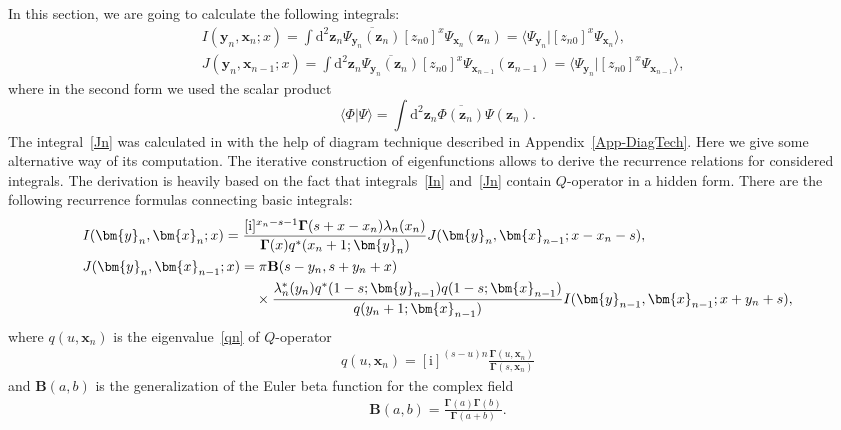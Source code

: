 \documentclass[10pt,a4paper]{amsart}
\renewcommand{\imath}{\mathrm{i}}
\numberwithin{equation}{section}
\begin{document}
In this section, we are going to calculate the following integrals:
\begin{align}
& \label{In}
I(\bm{y}_n,\bm{x}_{n};x) =
\int \mathrm{d}^{2}\bm{z}_n
\overline{\Psi_{\bm{y}_n}(\bm{z}_n)}
[z_{n0}]^{x}
\Psi_{\bm{x}_{n}}(\bm{z}_n) =
\langle\Psi_{\bm{y}_n}|[z_{n0}]^{x} \Psi_{\bm{x}_{n}}\rangle ,\\
& \label{Jn}
J(\bm{y}_n,\bm{x}_{n-1};x) =
\int \mathrm{d}^{2}\bm{z}_n
\overline{\Psi_{\bm{y}_n}(\bm{z}_n)}
[z_{n0}]^{x}
\Psi_{\bm{x}_{n-1}}(\bm{z}_{n-1}) =
\langle\Psi_{\bm{y}_n}|[z_{n0}]^{x} \Psi_{\bm{x}_{n-1}}\rangle ,
\end{align}
where in the second form we used the scalar product
\begin{equation*}
	\langle\Phi|\Psi\rangle =
	\int \mathrm{d}^{2}\bm{z}_n \overline{\Phi(\bm{z}_n)} \Psi(\bm{z}_n) .
\end{equation*}
The integral~\eqref{Jn} was calculated in \cite{Val20} with the help of diagram technique described in Appendix~\ref{App-DiagTech}.
Here we give some alternative way of its computation.
The iterative construction of eigenfunctions allows to derive the recurrence
relations for considered integrals. The derivation is heavily based on the fact that integrals~\eqref{In} and~\eqref{Jn} contain $Q$-operator in a hidden form. There are the following recurrence formulas connecting basic integrals:
\begin{align}
\label{In1}
&I(\bm{y}_n,\bm{x}_{n};x) = \frac{[\imath]^{x_n-s-1} \mathbf{\Gamma}(s+x-x_n) \lambda_n(x_n)}
{\mathbf{\Gamma}(x) q^*(x_n+1;\bm{y}_n)}
J(\bm{y}_n,\bm{x}_{n-1};x-x_n-s) ,\\
& \nonumber
J(\bm{y}_n,\bm{x}_{n-1};x) = \pi \mathbf{B}(s-y_n,s+y_n+x) \\
& \label{Jn1}
\hphantom{J(\bm{y}_n,\bm{x}_{n-1};x) =}{}
\times\frac{\lambda_n^\ast(y_n) q^{*}(1-s;\bm{y}_{n-1}) q(1-s;\bm{x}_{n-1})}
{q(y_{n}+1;\bm{x}_{n-1})}
 I(\bm{y}_{n-1},\bm{x}_{n-1};x+y_{n}+s) ,
\end{align}
where $q(u ,\bm x_{n})$ is the eigenvalue~\eqref{qn} of $Q$-operator
\begin{align*}
q(u ,\bm x_{n}) = [\imath]^{(s-u)n}
\frac{\mathbf{\Gamma}(u ,\bm{x}_n)}{\mathbf{\Gamma}(s ,\bm{x}_n)}
\end{align*}
and $\mathbf{B}(a,b)$ is the generalization of the Euler beta function for the complex field~\cite{GGR,N}
\begin{align*}
\mathbf{B}(a,b) =
\frac{\mathbf{\Gamma}(a) \mathbf{\Gamma}(b)}{\mathbf{\Gamma}(a+b)} .
\end{align*}
\end{document}
